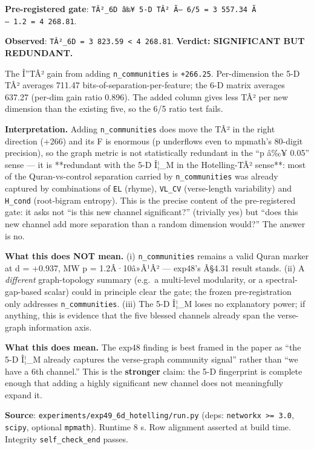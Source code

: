 \documentclass[
]{article}
\begin{document}
\textbf{Pre-registered gate}:
\texttt{TÂ²\_6D\ â‰¥\ 5-D\ TÂ²\ Ã—\ 6/5\ =\ 3\ 557.34\ Ã—\ 1.2\ =\ 4\ 268.81}.

\textbf{Observed}:
\texttt{TÂ²\_6D\ =\ 3\ 823.59\ \textless{}\ 4\ 268.81}. \textbf{Verdict:
SIGNIFICANT BUT REDUNDANT.}

The Î''TÂ² gain from adding \texttt{n\_communities} is \texttt{+266.25}.
Per-dimension the 5-D TÂ² averages 711.47
bits-of-separation-per-feature; the 6-D matrix averages 637.27 (per-dim
gain ratio 0.896). The added column gives less TÂ² per new dimension
than the existing five, so the 6/5 ratio test fails.

\textbf{Interpretation.} Adding \texttt{n\_communities} does move the
TÂ² in the right direction (+266) and its F is enormous (p underflows
even to mpmath's 80-digit precision), so the graph metric is not
statistically redundant in the ``p â‰¥ 0.05'' sense --- it is
**redundant with the 5-D Î¦\_M in the Hotelling-TÂ² sense**: most of the
Quran-vs-control separation carried by \texttt{n\_communities} was
already captured by combinations of \texttt{EL} (rhyme), \texttt{VL\_CV}
(verse-length variability) and \texttt{H\_cond} (root-bigram entropy).
This is the precise content of the pre-registered gate: it asks not ``is
this new channel significant?'' (trivially yes) but ``does this new
channel add more separation than a random dimension would?'' The answer
is no.

\textbf{What this does NOT mean.} (i) \texttt{n\_communities} remains a
valid Quran marker at d = +0.937, MW p = 1.2Â·10â»Â¹Â² --- exp48's
Â§4.31 result stands. (ii) A \emph{different} graph-topology summary
(e.g.~a multi-level modularity, or a spectral-gap-based scalar) could in
principle clear the gate; the frozen pre-registration only addresses
\texttt{n\_communities}. (iii) The 5-D Î¦\_M loses no explanatory power;
if anything, this is evidence that the five blessed channels already
span the verse-graph information axis.

\textbf{What this does mean.} The exp48 finding is best framed in the
paper as ``the 5-D Î¦\_M already captures the verse-graph community
signal'' rather than ``we have a 6th channel.'' This is the
\textbf{stronger} claim: the 5-D fingerprint is complete enough that
adding a highly significant new channel does not meaningfully expand it.

\textbf{Source}: \texttt{experiments/exp49\_6d\_hotelling/run.py} (deps:
\texttt{networkx\ \textgreater{}=\ 3.0}, \texttt{scipy}, optional
\texttt{mpmath}). Runtime 8 s. Row alignment asserted at build time.
Integrity \texttt{self\_check\_end} passes.
\end{document}
